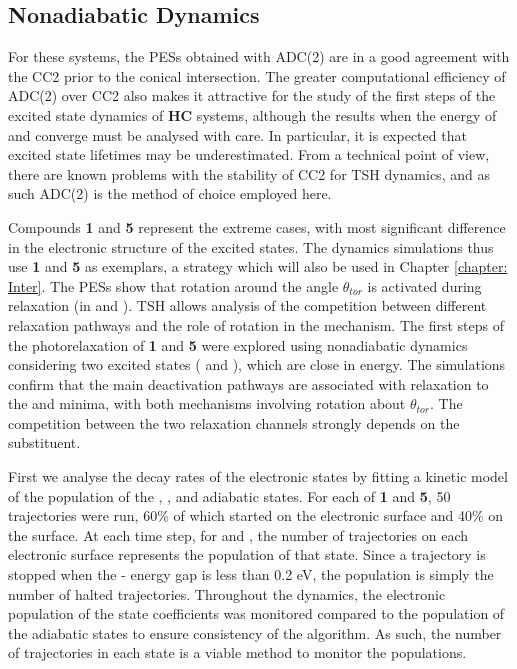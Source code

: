 \subsection{Nonadiabatic Dynamics}\label{section: NRdecay_Dynamics}
For these systems, the \sone{} \acp{PES} obtained with ADC(2) are in a good agreement with the CC2 prior to the conical intersection. The greater computational efficiency of ADC(2) over CC2 also makes it attractive for the study of the first steps of the excited state dynamics of \textbf{HC} systems, although the results when the energy of \sone{} and \szero{} converge must be analysed with care. In particular, it is expected that excited state lifetimes may be underestimated. From a technical point of view, there are known problems with the stability of CC2 for \ac{TSH} dynamics, and as such ADC(2) is the method of choice employed here.\cite{Plasser2014}

Compounds \textbf{1} and \textbf{5} represent the extreme cases, with most significant difference in the electronic structure of the excited states. The dynamics simulations thus use \textbf{1} and \textbf{5} as exemplars, a strategy which will also be used in Chapter \ref{chapter: Inter}.  The \acp{PES} show that rotation around the angle $\theta_{tor}$ is activated during relaxation (in \Estar{} and \Kstar{}). \ac{TSH} allows analysis of the competition between different relaxation pathways and the role of rotation in the mechanism. The first steps of the photorelaxation of \textbf{1} and \textbf{5} were explored using nonadiabatic dynamics considering two excited states (\stwo{} and \sone{}), which are close in energy. The simulations confirm that the main deactivation pathways are associated with relaxation to the \Kstar{} and \Estar{} minima, with both mechanisms involving  rotation about $\theta_{tor}$. The competition between the two relaxation channels strongly depends on the substituent. 

First we analyse the decay rates of the electronic states by fitting a kinetic model of the population of the \stwo{}, \sone{}, and \szero{} adiabatic states. For each of \textbf{1} and \textbf{5}, 50 trajectories were run, 60\% of which started on the \sone{} electronic surface and 40\% on the \stwo{} surface. At each time step, for \stwo{} and \sone{}, the number of trajectories on each electronic surface represents the population of that state. Since a trajectory is stopped when the \sone{}-\szero{} energy gap is less than 0.2 eV, the \szero{} population is simply the number of halted trajectories. Throughout the dynamics, the electronic population of the state coefficients was monitored compared to the population of the adiabatic states to ensure consistency of the algorithm. As such, the number of trajectories in each state is a viable method to monitor the populations.  

